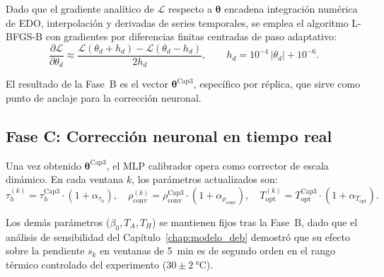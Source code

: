 Dado que el gradiente analítico de $\mathcal{L}$ respecto a $\boldsymbol{\theta}$ encadena integración numérica de EDO, interpolación y derivadas de series temporales, se emplea el algoritmo L-BFGS-B con gradientes por diferencias finitas centradas de paso adaptativo:
\begin{equation}
\frac{\partial \mathcal{L}}{\partial \theta_d} \approx
\frac{\mathcal{L}(\theta_d + h_d) - \mathcal{L}(\theta_d - h_d)}{2h_d},
\qquad
h_d = 10^{-4}\,|\theta_d| + 10^{-6}.
\label{eq:gradiente_df}
\end{equation}

El resultado de la Fase~B es el vector $\boldsymbol{\theta}^{\mathrm{Cap3}}$, específico por réplica, que sirve como punto de anclaje para la corrección neuronal.

\subsection{Fase C: Corrección neuronal en tiempo real}

Una vez obtenido $\boldsymbol{\theta}^{\mathrm{Cap3}}$, el MLP calibrador opera como corrector de escala dinámico. En cada ventana $k$, los parámetros actualizados son:
\begin{equation}
\tau_h^{(k)} = \tau_h^{\mathrm{Cap3}} \cdot (1 + \alpha_{\tau_h}),
\quad
\rho_{\mathrm{conv}}^{(k)} = \rho_{\mathrm{conv}}^{\mathrm{Cap3}} \cdot (1 + \alpha_{\rho_{\mathrm{conv}}}),
\quad
T_{\mathrm{opt}}^{(k)} = T_{\mathrm{opt}}^{\mathrm{Cap3}} \cdot (1 + \alpha_{T_{\mathrm{opt}}}).
\label{eq:actualizacion_param}
\end{equation}

Los demás parámetros ($\beta_0, T_A, T_H$) se mantienen fijos tras la Fase~B, dado que el análisis de sensibilidad del Capítulo~\ref{chap:modelo_deb} demostró que su efecto sobre la pendiente $s_k$ en ventanas de \SI{5}{\minute} es de segundo orden en el rango térmico controlado del experimento ($30 \pm \SI{2}{\celsius}$).
